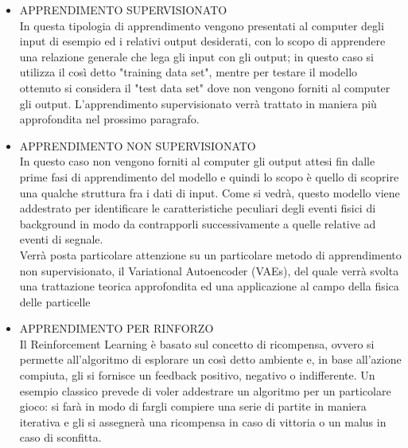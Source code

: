 	\begin{itemize}
		\item APPRENDIMENTO SUPERVISIONATO \\
			In questa tipologia di apprendimento vengono presentati al computer degli input di esempio ed i relativi output desiderati, con lo scopo di apprendere una relazione generale che lega gli input con gli output; in questo caso si utilizza il così detto "training data set", mentre per testare il modello ottenuto si considera il "test data set" dove non vengono forniti al computer gli output. L'apprendimento supervisionato verrà trattato in maniera più approfondita nel prossimo paragrafo.
		\item APPRENDIMENTO NON SUPERVISIONATO \\
			In questo caso non vengono forniti al computer gli output attesi fin dalle prime fasi di apprendimento del modello e quindi lo scopo è quello di scoprire una qualche struttura fra i dati di input.%
			Come si vedrà, questo modello viene addestrato per identificare le caratteristiche peculiari degli eventi fisici di background in modo da contrapporli successivamente a quelle relative ad eventi di segnale.\\
			Verrà posta particolare attenzione su un particolare metodo di apprendimento non supervisionato, il Variational Autoencoder (VAEs), del quale verrà svolta una trattazione teorica approfondita ed una applicazione al campo della fisica delle particelle
		\item APPRENDIMENTO PER RINFORZO \\
			Il Reinforcement Learning è basato sul concetto di ricompensa, ovvero si permette all'algoritmo di esplorare un così detto ambiente e, in base all'azione compiuta, gli si fornisce un feedback positivo, negativo o indifferente. Un esempio classico prevede di voler addestrare un algoritmo per un particolare gioco: si farà in modo di fargli compiere una serie di partite in maniera iterativa e gli si assegnerà una ricompensa in caso di vittoria o un malus in caso di sconfitta. \\ 
	\end{itemize}

